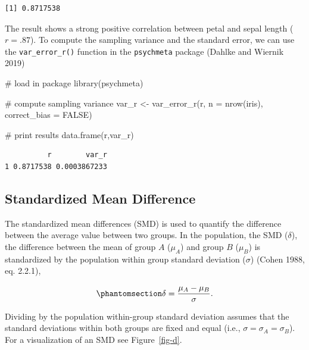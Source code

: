 \documentclass[
  letterpaper,
  DIV=11,
  numbers=noendperiod]{scrreprt}
\newenvironment{Shaded}{}{}
\newcommand{\AttributeTok}[1]{\textcolor[rgb]{0.00,0.34,0.68}{#1}}
\newcommand{\CommentTok}[1]{\textcolor[rgb]{0.54,0.53,0.53}{#1}}
\newcommand{\ConstantTok}[1]{\textcolor[rgb]{0.67,0.33,0.00}{#1}}
\newcommand{\FunctionTok}[1]{\textcolor[rgb]{0.39,0.29,0.61}{#1}}
\newcommand{\NormalTok}[1]{\textcolor[rgb]{0.12,0.11,0.11}{#1}}
\newcommand{\OtherTok}[1]{\textcolor[rgb]{0.00,0.43,0.16}{#1}}
\begin{document}
\begin{tcolorbox}
\begin{verbatim}
[1] 0.8717538
\end{verbatim}

The result shows a strong positive correlation between petal and sepal
length (\(r = .87\)). To compute the sampling variance and the standard
error, we can use the \texttt{var\_error\_r()} function in the
\texttt{psychmeta} package (Dahlke and Wiernik 2019)

\begin{Shaded}
\begin{Highlighting}[]
\CommentTok{\# load in package}
\FunctionTok{library}\NormalTok{(psychmeta)}

\CommentTok{\# compute sampling variance}
\NormalTok{var\_r }\OtherTok{\textless{}{-}} \FunctionTok{var\_error\_r}\NormalTok{(r, }\AttributeTok{n =} \FunctionTok{nrow}\NormalTok{(iris), }\AttributeTok{correct\_bias =} \ConstantTok{FALSE}\NormalTok{)}

\CommentTok{\# print results}
\FunctionTok{data.frame}\NormalTok{(r,var\_r) }
\end{Highlighting}
\end{Shaded}

\begin{verbatim}
          r        var_r
1 0.8717538 0.0003867233
\end{verbatim}

\end{tcolorbox}

\subsection{Standardized Mean
Difference}\label{standardized-mean-difference}

The standardized mean differences (SMD) is used to quantify the
difference between the average value between two groups. In the
population, the SMD (\(\delta\)), the difference between the mean of
group \(A\) (\(\mu_A\)) and group \(B\) (\(\mu_B\)) is standardized by
the population within group standard deviation (\(\sigma\)) (Cohen 1988,
eq. 2.2.1),

\begin{equation}\phantomsection\label{eq-delta}{
\delta = \frac{\mu_A - \mu_B}{\sigma}.
}\end{equation}

Dividing by the population within-group standard deviation assumes that
the standard deviations within both groups are fixed and equal (i.e.,
\(\sigma=\sigma_A=\sigma_B\)). For a visualization of an SMD see
Figure~\ref{fig-d}.
\end{document}
